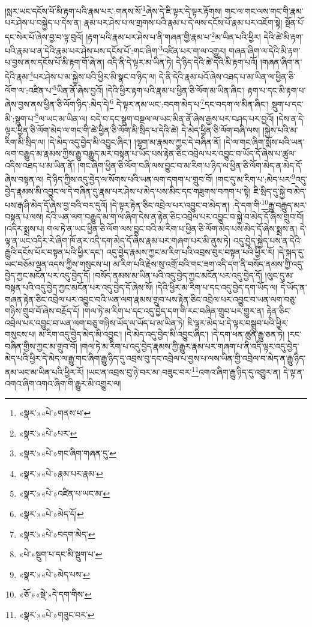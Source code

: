 །སླར་ཡང་དངོས་པོ་མི་རྟག་པའི་རྣམ་པར་:གནས་སོ་\footnote{«སྣར་»«པེ་»གནས་པ་}ཞེས་དེ་ཇི་ལྟར་དེ་ལྟར་རྟོགས། གང་ལ་གང་ལས་གང་གི་རྣམ་པར་ཤེས་པ་བསྐྱེད་པ་དེས་ན། རྣམ་པར་ཤེས་པ་ལ་གྲགས་པའི་རྣམ་པ་དེ་ལས་དངོས་པོ་རྣམ་པར་འཇོག་སྟེ། སྔོན་པོ་དང་སེར་པོ་ཞེས་བྱ་བ་ལྟ་བུའོ། །རྟག་པའི་རྣམ་པར་ཤེས་པ་ནི་གཞན་གྱི་རྣམ་པ་\footnote{«སྣར་»«པེ་»པར་}མ་ཡིན་པའི་ཕྱིར། དེའི་ཚེ་མི་རྟག་པའི་རྣམ་པ་ན་དེའི་རྣམ་པར་ཤེས་པས་དངོས་པོ་:གང་ཞིག་\footnote{«སྣར་»«པེ་»གང་ཞིག་གཞན་དུ་}འཛིན་པར་ག་ལ་འགྱུར། གཞན་ཞིག་ལ་དེའི་མི་རྟག་པ་བྱས་ནས་དངོས་པོ་མི་རྟག་གོ་ཞེ་ན། འདི་ནི་དེ་ལྟར་མ་ཡིན་ཏེ། དེ་ཉིད་དེའི་ཚེ་དེའི་མི་རྟག་པའོ། །གཞན་ཞིག་ན་དེའི་རྣམ་\footnote{«སྣར་»«པེ་»རྣམ་པར་རྣམ་}པར་ཤེས་པ་མ་སྐྱེས་པའི་ཕྱིར་མི་སྣང་བ་ཉིད་ལ། དེ་ནི་དེའི་རྣམ་པའོ་ཞེས་འཐད་པ་མ་ཡིན་ལ་ཕྱིན་ཅི་ལོག་ལ་:འཛིན་པ་\footnote{«སྣར་»«པེ་»འཛིན་པ་ཡང་མ་}ཡིན་ནོ་ཞེས་བྱའོ། །དེའི་ཕྱིར་རྟག་པའི་རྣམ་པ་ཕྱིན་ཅི་ལོག་མ་ཡིན་ཞིང་། རྟག་པ་དང་མི་རྟག་པ་ཞེས་བྱས་ནས་ཕྱིན་ཅི་ལོག་ཉིད་:མེད་དེ།\footnote{«སྣར་»«པེ་»མེད་དོ།} དེ་ལྟར་ནམ་ཡང་:བདག་མེད་པ་\footnote{«སྣར་»«པེ་»བདག་མེད་}དང་བདག་ལ་མིན་ཞིང་། སྡུག་པ་དང་མི་:སྡུག་པ་\footnote{«པེ་»སྡུག་པ་དང་མི་སྡུག་པ་}ལ་ཡང་མ་ཡིན་ལ། བདེ་བ་དང་སྡུག་བསྔལ་ལ་ཡང་མིན་ནོ་ཞེས་རྒྱས་པར་བཤད་པར་བྱའོ། །དེས་ན་དེ་ལྟར་ཕྱིན་ཅི་ལོག་མེད་ལ་གང་གི་ཚེ་ཕྱིན་ཅི་ལོག་མི་སྲིད་པ་དེའི་ཚེ། དེ་མེད་ཕྱིན་ཅི་ལོག་བཞི་ལས། །སྐྱེས་པའི་མ་རིག་མི་སྲིད་ལ། །དེ་མེད་འདུ་བྱེད་མི་འབྱུང་ཞིང་། །ལྷག་མ་རྣམས་ཀྱང་དེ་བཞིན་ནོ། །དེ་ལ་གང་ཞིག་སྨོས་པའི་ཡན་ལག་བརྒྱུད་མ་རྣམས་ཀྱིས་རྒྱུ་བརྒྱུད་མར་བསྟན་པ་ཡོད་པས་རྟེན་ཅིང་འབྲེལ་པར་འབྱུང་བ་ཡོད་དོ་ཞེས་པ་ཚུལ་འདིས་འཐད་པ་མ་ཡིན་ནོ། །གང་ཞིག་ཕྱིན་ཅི་ལོག་བཞི་ལས་བྱུང་བ་མ་རིག་པ་ཉིད་ལ་ཕྱིན་ཅི་ལོག་མེད་ན་མེད་དོ་ཞེས་བསྟན་ལ། དེ་ཉིད་ཀྱིས་འདུ་བྱེད་ལ་སོགས་པའི་ཡན་ལག་དགག་པ་གྲུབ་བོ། །གང་དུ་མ་རིག་པ་:མེད་པར་\footnote{«སྣར་»«པེ་»མེད་པས་}འདུ་བྱེད་རྣམས་མི་འབྱུང་ལ་དེ་བཞིན་དུ་རྣམ་པར་ཤེས་པ་མེད་པས་མིང་དང་གཟུགས་བཀག་པ་སྟེ། ཇི་སྲིད་དུ་སྐྱེ་བ་མེད་པས་རྒ་ཤི་མེད་དོ་ཞེས་བྱ་བའི་བར་དུའོ། །དེ་ལྟར་རྟེན་ཅིང་འབྲེལ་པར་འབྱུང་བ་མེད་ན། :དེ་དག་གི་\footnote{«ཅོ་»«སྡེ་»དེ་དག་གིས་}རྒྱུ་བརྒྱུད་མར་བསྟན་པ་ལས། དེའི་ཡན་ལག་བརྒྱུད་མ་ག་ལ་ཞིག་དེས་ན་རྟེན་ཅིང་འབྲེལ་པར་འབྱུང་བ་སྐྱེ་བ་མེད་དོ་ཞེས་གྲུབ་བོ། །འདིར་སྨྲས་པ། གལ་ཏེ་ན་ཡང་ཕྱིན་ཅི་ལོག་ལས་བྱུང་བའི་མ་རིག་པ་ཕྱིན་ཅི་ལོག་མེད་པས་མེད་དོ་ཞེས་སྨྲས་ན། དེ་ལྟ་ན་ཡང་འདིར་རེ་ཞིག་ཁོ་ནར་འདི་དག་མེད་དོ་ཞེས་རྣམ་པར་གཞག་པར་མི་ནུས་ཏེ། འདུ་བྱེད་སྐྱེད་པས་ན་དེའི་རྒྱུའི་དངོས་པོར་བསྟན་པའི་ཕྱིར་དང་། འདུ་བྱེད་རྣམས་ཀྱང་མ་རིག་པའི་འབྲས་བུར་བསྟན་པའི་ཕྱིར་རོ། །དེ་སྐད་དུ་ཡང་བཅོམ་ལྡན་འདས་ཀྱིས་གསུངས་པ། མ་རིག་པའི་རྗེས་སུ་འགྲོ་བའི་གང་ཟག་འདི་དག་ནི་བསོད་ནམས་ཀྱི་འདུ་བྱེད་ཀྱང་མངོན་པར་འདུ་བྱེད་དོ། །བསོད་ནམས་མ་ཡིན་པའི་འདུ་བྱེད་ཀྱང་མངོན་པར་འདུ་བྱེད་དོ། །ལུང་དུ་མ་བསྟན་པའི་འདུ་བྱེད་ཀྱང་མངོན་པར་འདུ་བྱེད་དོ་ཞེས་སོ། །དེའི་ཕྱིར་མ་རིག་པ་དང་འདུ་བྱེད་དག་ཡོད་ལ། དེ་ཡོད་ན་གཞན་རྟེན་ཅིང་འབྲེལ་པར་འབྱུང་བའི་ཡན་ལག་རྣམས་གྲུབ་པས་རྟེན་ཅིང་འབྲེལ་པར་འབྱུང་བ་ཡན་ལག་བཅུ་གཉིས་གྲུབ་བོ་ཞེས་བརྗོད་དོ། །གལ་ཏེ་མ་རིག་པ་དང་འདུ་བྱེད་དག་གི་རང་བཞིན་གྲུབ་པར་གྱུར་ན། རྟེན་ཅིང་འབྲེལ་པར་འབྱུང་བ་ཡན་ལག་བཅུ་གཉིས་ཡོད་ལ་ཡོད་པ་མ་ཡིན་ཏེ། ཇི་ལྟར་མེད་པ་དེ་ལྟར་བསྒྲུབ་པའི་ཕྱིར་གསུངས་པ། མ་རིག་འདུ་བྱེད་མེད་མི་འབྱུང་། །དེ་མེད་འདུ་བྱེད་མི་འབྱུང་ཞིང་། །དེ་དག་ཕན་ཚུན་རྒྱུ་ཅན་ཏེ། །རང་བཞིན་གྱིས་ཀྱང་མ་གྲུབ་བོ། །གལ་ཏེ་མ་རིག་པ་འདུ་བྱེད་རྣམས་ཀྱི་རྒྱུར་རྣམ་པར་གཞག་པ་ནི་འདི་ལྟར་འདུ་བྱེད་མེད་པའི་ཕྱིར་དེ་མེད་ལ་རྒྱུ་གང་ཞིག་རྒྱུ་ཉིད་དུ་འབྲས་བུ་དང་འབྲེལ་པ་བྱས་པ་ལས་ཡིན་གྱི་འབྲེལ་བ་མེད་ན་རྒྱུ་ཉིད་ནམ་ཡང་མ་ཡིན་པའི་ཕྱིར་རོ། །ཡང་ན་འབྲས་བུ་ཉེ་བར་མ་:བཟུང་བར་\footnote{«སྣར་»«པེ་»གཟུང་བར་}འགའ་ཞིག་རྒྱུ་ཉིད་དུ་འགྱུར་ན། དེ་ལྟ་ན་འགའ་ཞིག་འགའ་ཞིག་གི་རྒྱུར་མི་འགྱུར་ལ། 